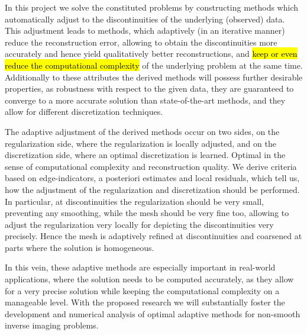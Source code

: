 \documentclass[enabledeprecatedfontcommands,cleardoublepage=empty,headsepline,twoside,11pt,DIV=15,BCOR=12mm,final]{scrartcl}
\begin{document}
In this project we solve the constituted problems by constructing methods which automatically adjust to the discontinuities of the underlying (observed) data. This adjustment leads to methods, which adaptively (in an iterative manner) reduce the reconstruction error, allowing to obtain the discontinuities more accurately and hence yield qualitatively better reconstructions, and \hl{keep or even reduce the computational complexity}   of the underlying problem at the same time. Additionally to these attributes the derived methods will possess further desirable properties, as robustness with respect to the given data, they are guaranteed to converge to a more accurate solution than state-of-the-art methods, and they allow for different discretization techniques. 

The adaptive adjustment of the derived methods occur on two sides, on the regularization side, where the regularization is locally adjusted, and on the discretization side, where an optimal discretization is learned. Optimal in the sense of computational complexity and reconstruction quality. We derive criteria based on edge-indicators, a posteriori estimates and local residuals, which tell us, how the adjustment of the regularization and discretization should be performed. In particular, at discontinuities the regularization should be very small, preventing any smoothing, while the mesh should be very fine too, allowing to adjust the regularization very locally for depicting the discontinuities very precisely. Hence the mesh is adaptively refined at discontinuities and coarsened at parts where the solution is homogeneous.



In this vein, these adaptive methods are especially important in real-world applications, where the solution needs to be computed accurately, as they allow for a very precise solution while keeping the computational complexity on a manageable level. With the proposed research we will substantially foster the development and numerical analysis of optimal adaptive methods for non-smooth inverse imaging problems. %
\end{document}
